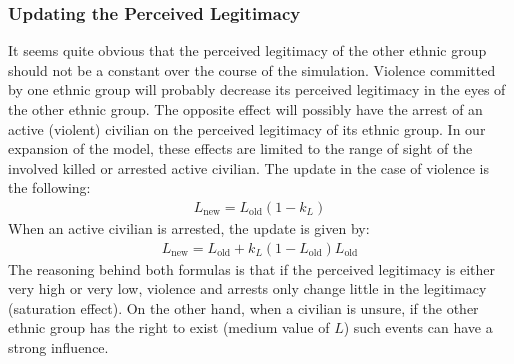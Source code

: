 \documentclass[11pt]{article}
\begin{document}
\subsubsection{Updating the Perceived Legitimacy}
It seems quite obvious that the perceived legitimacy of the other ethnic group should not be a constant over the course of the simulation. Violence committed by one ethnic group will probably decrease its perceived legitimacy in the eyes of the other ethnic group. The opposite effect will possibly have the arrest of an active (violent) civilian on the perceived legitimacy of its ethnic group. In our expansion of the model, these effects are limited to the range of sight of the involved killed or arrested active civilian. The update in the case of violence is the following:
\begin{align}
L_{\text{new}} = L_{\text{old}} \left( 1 - k_L \right)
\label{eqn:update_violence}
\end{align}
When an active civilian is arrested, the update is given by:
\begin{align}
L_{\text{new}} = L_{\text{old}} + k_L \left( 1 - L_{\text{old}} \right) L_{\text{old}}
\label{eqn:update_arrest}
\end{align}
The reasoning behind both formulas is that if the perceived legitimacy is either very high or very low, violence and arrests only change little in the legitimacy (saturation effect). On the other hand, when a civilian is unsure, if the other ethnic group has the right to exist (medium value of $L$) such events can have a strong influence.
\end{document}
